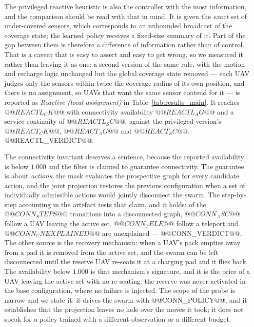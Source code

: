 The privileged reactive heuristic is also the controller with the most
information, and the comparison should be read with that in mind.  It is
given the \emph{exact} set of under-covered sensors, which corresponds to an
unbounded broadcast of the coverage state; the learned policy receives a
fixed-size summary of it.  Part of the gap between them is therefore a
difference of information rather than of control.  That is a caveat that is
easy to assert and easy to get wrong, so we measured it rather than leaving
it as one: a second version of the same rule, with the motion and recharge
logic unchanged but the global coverage state removed --- each UAV judges
only the sensors within twice the coverage radius of its own position, and
there is no assignment, so UAVs that want the same sensor contend for it
--- is reported as \emph{Reactive (local assignment)} in Table~\ref{tab:results_main}.  It
reaches $@@REACTL_CK@@$ with connectivity availability $@@REACTL_AG@@$ and
a service continuity of $@@REACTL_SC@@$, against the privileged version's
$@@REACT_CK@@$, $@@REACT_AG@@$ and $@@REACT_SC@@$.  @@REACTL_VERDICT@@.

The connectivity invariant deserves a sentence, because the reported
availability is below $1.000$ and the filter is claimed to guarantee
connectivity.  The guarantee is about \emph{actions}: the mask evaluates
the prospective graph for every candidate action, and the joint projection
restores the previous configuration when a set of individually admissible
actions would jointly disconnect the swarm.  The step-by-step accounting
in the artefact tests that claim, and it holds: of the $@@CONN_STEPS@@$
transitions into a disconnected graph, $@@CONN_ASC@@$ follow a UAV
leaving the active set, $@@CONN_TELE@@$ follow a teleport and
$@@CONN_UNEXPLAINED@@$ are unexplained --- @@CONN_VERDICT@@.
The other source is the recovery mechanism: when a UAV's pack empties away
from a pad it is removed from the active set, and the swarm can be left
disconnected until the reserve UAV re-seats it at a charging pad and it
flies back.  The availability below $1.000$ is that mechanism's signature,
and it is the price of a UAV leaving the active set with no re-seating: the
reserve was never activated in the base configuration, where no failure is
injected.
The scope of the probe is narrow and we state it: it drives the swarm with
@@CONN_POLICY@@, and it establishes that the projection leaves no hole over
the moves it took; it does not speak for a policy trained with a different
observation or a different budget.

